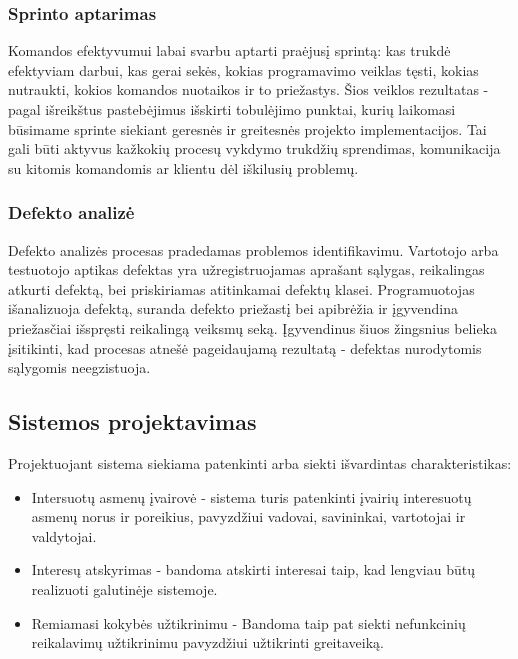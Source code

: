 \documentclass{VUMIFPSkursinis}
\begin{document}
	\subsubsection{Sprinto aptarimas}
	Komandos efektyvumui labai svarbu aptarti praėjusį sprintą: kas trukdė efektyviam darbui, kas gerai sekės, kokias programavimo veiklas tęsti, kokias nutraukti, kokios komandos nuotaikos ir to priežastys. Šios veiklos rezultatas - pagal išreikštus pastebėjimus išskirti tobulėjimo punktai, kurių laikomasi būsimame sprinte siekiant geresnės ir greitesnės projekto implementacijos. Tai gali būti aktyvus kažkokių procesų vykdymo trukdžių sprendimas, komunikacija su kitomis komandomis ar klientu dėl iškilusių problemų.
	\subsubsection{Defekto analizė}
	Defekto analizės procesas pradedamas problemos identifikavimu. Vartotojo arba testuotojo aptikas defektas yra užregistruojamas aprašant sąlygas, reikalingas atkurti defektą, bei priskiriamas atitinkamai defektų klasei. Programuotojas išanalizuoja defektą, suranda defekto priežastį bei apibrėžia ir įgyvendina priežasčiai išspręsti reikalingą veiksmų seką. Įgyvendinus šiuos žingsnius belieka įsitikinti, kad procesas atnešė pageidaujamą rezultatą - defektas nurodytomis sąlygomis neegzistuoja.

	\subsection{Sistemos projektavimas}
	Projektuojant sistema siekiama patenkinti arba siekti išvardintas charakteristikas:
	\begin{itemize}
		\item{
			Intersuotų asmenų įvairovė - sistema turis patenkinti įvairių interesuotų asmenų norus ir poreikius, pavyzdžiui vadovai, savininkai, vartotojai ir valdytojai.
		}
		\item{Interesų atskyrimas - bandoma atskirti interesai taip, kad lengviau būtų realizuoti galutinėje sistemoje.  }
		\item{Remiamasi kokybės užtikrinimu - Bandoma taip pat siekti nefunkcinių reikalavimų užtikrinimu pavyzdžiui užtikrinti greitaveiką.}
	\end{itemize}
\end{document}
